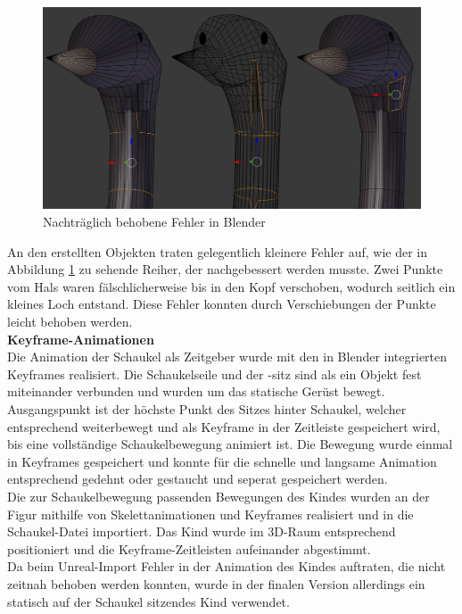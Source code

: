 \documentclass{Bericht}
\begin{document}
		
	

		\begin{figure}[H] %
			\centering
			\includegraphics[height=\textheight, width=\linewidth, keepaspectratio, angle=0]{../Bilder/Heron_Problem.png} %
			\caption{Nachträglich behobene Fehler in Blender}
			\label{img:heron-error}
		\end{figure}

An den erstellten Objekten traten gelegentlich kleinere Fehler auf, wie der in Abbildung \ref{img:heron-error} zu sehende Reiher, der nachgebessert werden musste. Zwei Punkte vom Hals waren fälschlicherweise bis in den Kopf verschoben, wodurch seitlich ein kleines Loch entstand. Diese Fehler konnten durch Verschiebungen der Punkte leicht behoben werden.\\
			 
\textbf{Keyframe-Animationen}\\
Die Animation der Schaukel als Zeitgeber wurde mit den in Blender integrierten Keyframes realisiert. Die Schaukelseile und der -sitz sind als ein Objekt fest miteinander verbunden und wurden um das statische Gerüst bewegt. Ausgangspunkt ist der höchste Punkt des Sitzes hinter Schaukel, welcher entsprechend weiterbewegt und als Keyframe in der Zeitleiste gespeichert wird, bis eine vollständige Schaukelbewegung animiert ist. Die Bewegung wurde einmal in Keyframes gespeichert und konnte für die schnelle und langsame Animation entsprechend gedehnt oder gestaucht und seperat gespeichert werden.\\
Die zur Schaukelbewegung passenden Bewegungen des Kindes wurden an der Figur mithilfe von Skelettanimationen und Keyframes realisiert und in die Schaukel-Datei importiert. Das Kind wurde im 3D-Raum entsprechend positioniert und die Keyframe-Zeitleisten aufeinander abgestimmt. \\
Da beim Unreal-Import Fehler in der Animation des Kindes auftraten, die nicht zeitnah behoben werden konnten, wurde in der finalen Version allerdings ein statisch auf der Schaukel sitzendes Kind verwendet. 
		
\end{document}
